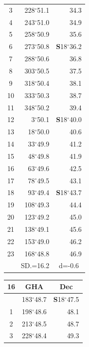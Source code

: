 \documentclass[10pt, a4paper]{report}
\begin{document}
\begin{scriptsize}
\begin{tabular*}{0.2\textwidth}[t]{@{\extracolsep{\fill}}|c|rr|}
3 & 228$^\circ$51.1 & \raisebox{0.24ex}{\boldmath$\cdot$~\boldmath$\cdot$~~}34.3\\
4 & 243$^\circ$51.0 & 34.9\\
5 & 258$^\circ$50.9 & 35.6\\[2Pt]
6 & 273$^\circ$50.8 & \textbf{S}18$^\circ$36.2\\
7 & 288$^\circ$50.6 & 36.8\\
8 & 303$^\circ$50.5 & 37.5\\
9 & 318$^\circ$50.4 & \raisebox{0.24ex}{\boldmath$\cdot$~\boldmath$\cdot$~~}38.1\\
10 & 333$^\circ$50.3 & 38.7\\
11 & 348$^\circ$50.2 & 39.4\\[2Pt]
12 & 3$^\circ$50.1 & \textbf{S}18$^\circ$40.0\\
13 & 18$^\circ$50.0 & 40.6\\
14 & 33$^\circ$49.9 & 41.2\\
15 & 48$^\circ$49.8 & \raisebox{0.24ex}{\boldmath$\cdot$~\boldmath$\cdot$~~}41.9\\
16 & 63$^\circ$49.6 & 42.5\\
17 & 78$^\circ$49.5 & 43.1\\[2Pt]
18 & 93$^\circ$49.4 & \textbf{S}18$^\circ$43.7\\
19 & 108$^\circ$49.3 & 44.4\\
20 & 123$^\circ$49.2 & 45.0\\
21 & 138$^\circ$49.1 & \raisebox{0.24ex}{\boldmath$\cdot$~\boldmath$\cdot$~~}45.6\\
22 & 153$^\circ$49.0 & 46.2\\
23 & 168$^\circ$48.8 & 46.9\\
\hline
\rule{0pt}{2.4ex} & \multicolumn{1}{c}{SD.=16.2} & \multicolumn{1}{c|}{d=-0.6}\\
\hline
\end{tabular*}\noindent
\begin{tabular*}{0.2\textwidth}[t]{@{\extracolsep{\fill}}|c|rr|}
\hline
\multicolumn{1}{|c|}{\rule{0pt}{2.6ex}\textbf{16}} & \multicolumn{1}{c}{\textbf{GHA}} & \multicolumn{1}{c|}{\textbf{Dec}}\\
\hline\rule{0pt}{2.6ex}\noindent
0 & 183$^\circ$48.7 & \textbf{S}18$^\circ$47.5\\
1 & 198$^\circ$48.6 & 48.1\\
2 & 213$^\circ$48.5 & 48.7\\
3 & 228$^\circ$48.4 & \raisebox{0.24ex}{\boldmath$\cdot$~\boldmath$\cdot$~~}49.3\\

\end{tabular*}
\end{scriptsize}
\end{document}
